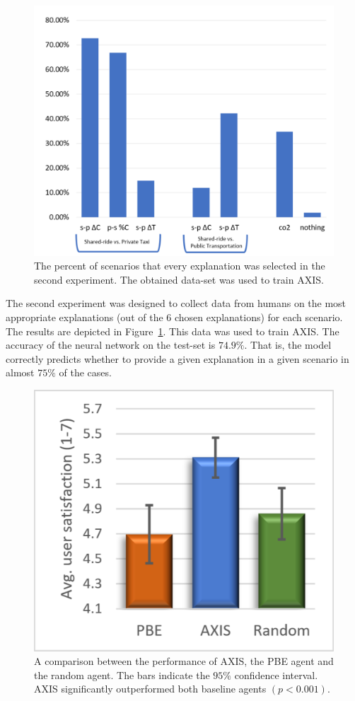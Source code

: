 \documentclass[letterpaper]{article} %
\begin{document}
\begin{figure}[hbpt]
\centering
\includegraphics[width=\columnwidth]{bar_q2.pdf} 
\caption{The percent of scenarios that every explanation was selected in the second experiment. The obtained data-set was used to train AXIS.}
\label{fig:humanResults2}
\end{figure}

The second experiment was designed to collect data from humans on the most appropriate explanations (out of the $6$ chosen explanations) for each scenario. The results are depicted in Figure~\ref{fig:humanResults2}. This data was used to train AXIS. 
The accuracy of the neural network on the test-set is $74.9\%$. That is, the model correctly predicts whether to provide a given explanation in a given scenario in almost $75\%$ of the cases.

\begin{figure}[hbpt]
\centering
\includegraphics[width=0.85\columnwidth]{Performance.pdf} 
\caption{A comparison between the performance of AXIS, the PBE agent and the random agent. The bars indicate the $95\%$ confidence interval.
AXIS significantly outperformed both baseline agents $(p<0.001)$.}
\label{fig:humanResults3}
\end{figure}
\end{document}
